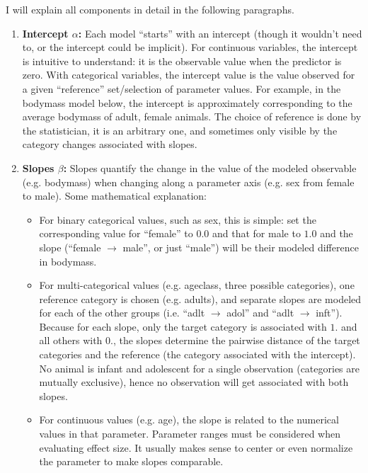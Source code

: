 I will explain all components in detail in the following paragraphs.

\begin{enumerate}
\item \textbf{Intercept \(\alpha\):}
\label{sec:org034f04c}
Each model ``starts'' with an intercept (though it wouldn't need to, or the intercept could be implicit).
For continuous variables, the intercept is intuitive to understand: it is the observable value when the predictor is zero.
With categorical variables, the intercept value is the value observed for a given ``reference'' set/selection of parameter values.
For example, in the bodymass model below, the intercept is approximately corresponding to the average bodymass of adult, female animals.
The choice of reference is done by the statistician, it is an arbitrary one, and sometimes only visible by the category changes associated with slopes.

\item \textbf{Slopes \(\beta\):}
\label{sec:org2c291e4}
Slopes quantify the change in the value of the modeled observable (e.g. bodymass) when changing along a parameter axis (e.g. sex from female to male).
Some mathematical explanation:
\begin{itemize}
\item For binary categorical values, such as sex, this is simple: set the corresponding value for ``female'' to \(0.0\) and that for male to \(1.0\) and the slope (``female \(\rightarrow\) male'', or just ``male'') will be their modeled difference in bodymass.
\item For multi-categorical values (e.g. ageclass, three possible categories), one reference category is chosen (e.g. adults), and separate slopes are modeled for each of the other groups (i.e. ``adlt \(\rightarrow\) adol'' and ``adlt \(\rightarrow\) inft''). Because for each slope, only the target category is associated with \(1.\) and all others with \(0.\), the slopes determine the pairwise distance of the target categories and the reference (the category associated with the intercept). No animal is infant and adolescent for a single observation (categories are mutually exclusive), hence no observation will get associated with both slopes.
\item For continuous values (e.g. age), the slope is related to the numerical values in that parameter. Parameter ranges must be considered when evaluating effect size. It usually makes sense to center or even normalize the parameter to make slopes comparable.
\end{itemize}


\end{enumerate}
